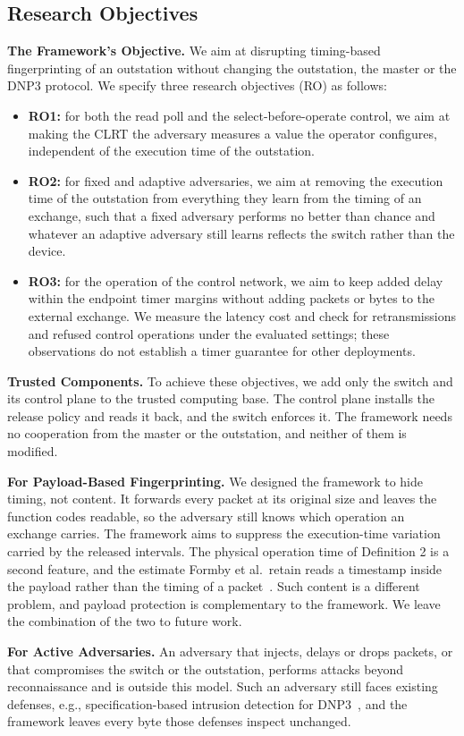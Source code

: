 \subsection{Research Objectives}
\label{sec:threat:ro}

\textbf{The Framework's Objective.} We aim at disrupting timing-based fingerprinting of an
outstation without changing the outstation, the master or the DNP3 protocol.
We specify three research objectives (RO) as follows:
\begin{itemize}
  \item \textbf{RO1:} for both the read poll and the select-before-operate control, we aim at
    making the CLRT the adversary measures a value the operator configures, independent of the
    execution time of the outstation.
  \item \textbf{RO2:} for fixed and adaptive adversaries, we aim at removing the execution time of
    the outstation from everything they learn from the timing of an exchange, such that a fixed
    adversary performs no better than chance and whatever an adaptive adversary still learns
    reflects the switch rather than the device.
  \item \textbf{RO3:} for the operation of the control network, we aim to keep added delay within
    the endpoint timer margins without adding packets or bytes to the external exchange. We
    measure the latency cost and check for retransmissions and refused control operations under
    the evaluated settings; these observations do not establish a timer guarantee for other deployments.
\end{itemize}

\textbf{Trusted Components.} To achieve these objectives, we add only the switch and its control
plane to the trusted computing base. The control plane installs the release policy and reads it
back, and the switch enforces it. The framework needs no cooperation from the master or the
outstation, and neither of them is modified.

\textbf{For Payload-Based Fingerprinting.} We designed the framework to hide timing, not content.
It forwards every packet at its original size and leaves the function codes readable, so the
adversary still knows which operation an exchange carries. The framework aims to suppress the execution-time variation carried by the released intervals. The physical operation time of Definition 2 is a second feature, and the estimate Formby et al.\ retain reads a timestamp inside the payload rather than the timing of a
packet~\cite{formby2016}. Such content is a different problem, and payload
protection is complementary to the framework. We leave the combination of the two to future work.

\textbf{For Active Adversaries.} An adversary that injects, delays or drops packets, or that
compromises the switch or the outstation, performs attacks beyond reconnaissance and is outside this
model. Such an adversary still faces existing defenses, e.g., specification-based intrusion
detection for DNP3~\cite{linbro2013}, and the framework leaves every byte those
defenses inspect unchanged.
